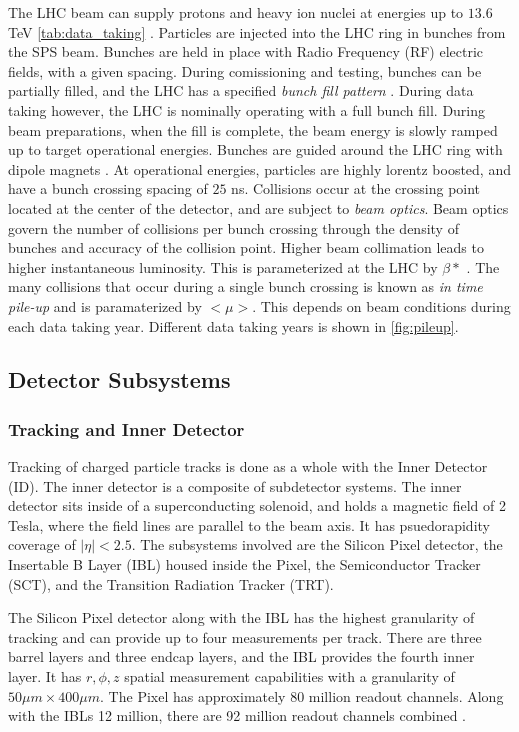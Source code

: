 \documentclass[12pt]{article}
\begin{document}
The LHC beam can supply protons and heavy ion nuclei at energies up to $13.6$
TeV \ref{tab:data_taking} \cite{Aad_2024}. Particles are injected into the LHC
ring in bunches from the SPS beam. Bunches are held in place with Radio
Frequency (RF) electric fields, with a given spacing. During comissioning and
testing, bunches can be partially filled, and the LHC has a specified
\textit{bunch fill pattern} \cite{}. During data taking however, the LHC is nominally
operating with a full bunch fill. During beam preparations, when the fill is
complete, the beam energy is slowly ramped up to target operational energies.
Bunches are guided around the LHC ring with dipole magnets \cite{}. At
operational energies, particles are highly lorentz boosted, and have a bunch
crossing spacing of $25$ ns. Collisions occur at the crossing point located at
the center of the detector, and are subject to \textit{beam optics}. Beam optics
govern the number of collisions per bunch crossing through the density of
bunches and accuracy of the collision point. Higher beam collimation leads to
higher instantaneous luminosity. This is parameterized at the LHC by $\beta*$
\cite{Aad_2024}. The many collisions that occur during a single bunch crossing
is known as \textit{in time pile-up} and is paramaterized by $<\mu>$. This
depends on beam conditions during each data taking year. Different data taking
years is shown in \ref{fig:pileup}. 

\subsection{Detector Subsystems}
\subsubsection{Tracking and Inner Detector}
Tracking of charged particle tracks is done as a whole with the Inner Detector
(ID). The inner detector is a composite of subdetector systems. The inner
detector sits inside of a superconducting solenoid, and holds a magnetic field
of 2 Tesla, where the field lines are parallel to the beam axis. It has
psuedorapidity coverage of $|\eta| < 2.5$. The subsystems involved are the
Silicon Pixel detector, the Insertable B Layer (IBL) housed inside the Pixel,
the Semiconductor Tracker (SCT), and the Transition Radiation Tracker (TRT).

The Silicon Pixel detector along with the IBL has the highest granularity of
tracking and can provide up to four measurements per track. There are three
barrel layers and three endcap layers, and the IBL provides the fourth inner
layer. It has $r, \phi, z$ spatial measurement capabilities with a granularity
of $50 \mu m \times 400 \mu m$. The Pixel has approximately 80 million readout
channels. Along with the IBLs 12 million, there are 92 million readout channels
combined \cite{Aad_2024}.
\end{document}
